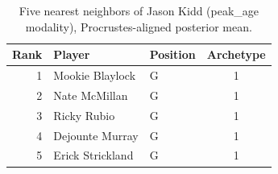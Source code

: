 \begin{table}[htbp]
  \centering\small
  \begin{tabular}{rllc}
    \toprule
    Rank & Player & Position & Archetype \\
    \midrule
    1 & Mookie Blaylock & G & 1 \\
    2 & Nate McMillan & G & 1 \\
    3 & Ricky Rubio & G & 1 \\
    4 & Dejounte Murray & G & 1 \\
    5 & Erick Strickland & G & 1 \\
    \bottomrule
  \end{tabular}
  \caption{Five nearest neighbors of Jason Kidd (peak_age modality), Procrustes-aligned posterior mean.}
  \label{tab:Jason_Kidd_neighbors_peak_age}
\end{table}

